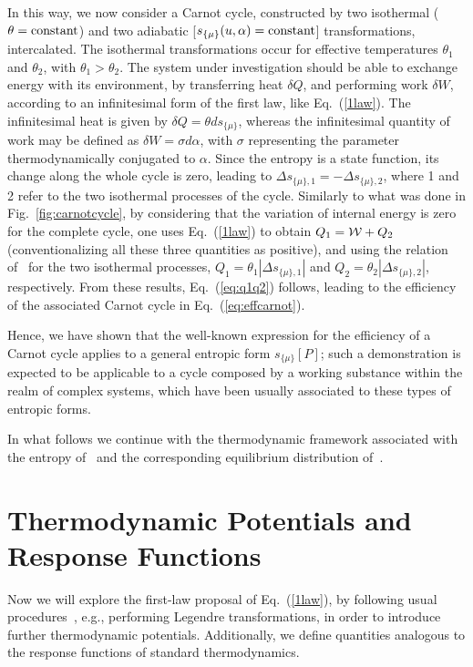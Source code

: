 \documentclass[showpacs,preprintnumbers,amsmath,amssymb,eqsecnum]{revtex4}
\begin{document}
In this way, we now consider a Carnot cycle, constructed by two
isothermal ($\theta={\rm constant}$) and two adiabatic
[$s_{\{ \mu \}}(u,\alpha)={\rm constant}$] transformations, intercalated.
The isothermal transformations occur for effective temperatures
$\theta_{1}$ and $\theta_{2}$, with $\theta_{1}>\theta_{2}$.
The system under investigation should be able to exchange energy with
its environment, by transferring heat $\delta Q$, and performing
work $\delta W$, according to an infinitesimal form of the
first law, like Eq.~(\ref{1law}).
The infinitesimal heat is given by $\delta Q=\theta ds_{\{ \mu \}}$, whereas
the infinitesimal quantity of work may be defined as $\delta W=\sigma d\alpha$,
with $\sigma$ representing the
parameter thermodynamically conjugated to $\alpha$.
Since the entropy is a state function, its change along the whole
cycle is zero, leading to
$\Delta s_{\{ \mu \},1}=-\Delta s_{\{ \mu \},2}$,
where 1 and 2 refer to the two isothermal processes of the cycle.
Similarly to what was done in Fig.~\ref{fig:carnotcycle}, by
considering that the variation of internal energy is zero for the complete
cycle, one uses Eq.~(\ref{1law}) to obtain
$Q_{1}={\cal W}+Q_{2}$ (conventionalizing  all these three
quantities as positive), and using the relation of~
for the two isothermal processes,
$Q_{1} = \theta_{1} |\Delta s_{\{ \mu \},1}|$
and $Q_{2} = \theta_{2} |\Delta s_{\{ \mu \},2}|$, respectively.
From these results, Eq.~(\ref{eq:q1q2}) follows, leading to
the efficiency of the associated Carnot cycle in Eq.~(\ref{eq:effcarnot}).

Hence, we have shown that the well-known expression for the
efficiency of a Carnot cycle
applies to a general entropic form $s_{\{ \mu \}}[P]$;
such a demonstration is expected to be applicable to a cycle composed by a
working substance within the realm of
complex systems, which have been usually associated to these types of
entropic forms.

In what follows we continue with the thermodynamic framework
associated with the entropy
of~ and the corresponding equilibrium
distribution of~.

\section{Thermodynamic Potentials and  Response Functions}

Now we will explore the first-law proposal of Eq.~(\ref{1law}), by
following usual procedures~\cite{reichl,balian,reif}, e.g.,
performing Legendre transformations, in order to introduce further
thermodynamic potentials. Additionally, we
define quantities analogous to the response functions of standard
thermodynamics.
\end{document}
